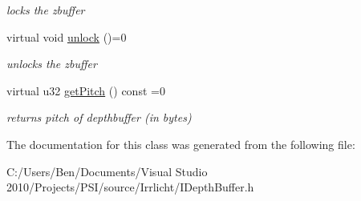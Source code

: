\begin{DoxyCompactItemize}
\begin{DoxyCompactList}\small\item\em locks the zbuffer \end{DoxyCompactList}\item 
\hypertarget{classirr_1_1video_1_1_i_depth_buffer_a34343e991438b4ad2d62d99807f124a0}{virtual void \hyperlink{classirr_1_1video_1_1_i_depth_buffer_a34343e991438b4ad2d62d99807f124a0}{unlock} ()=0}\label{classirr_1_1video_1_1_i_depth_buffer_a34343e991438b4ad2d62d99807f124a0}

\begin{DoxyCompactList}\small\item\em unlocks the zbuffer \end{DoxyCompactList}\item 
\hypertarget{classirr_1_1video_1_1_i_depth_buffer_afc80294a7fbf1d8e1ae675e674929a3f}{virtual u32 \hyperlink{classirr_1_1video_1_1_i_depth_buffer_afc80294a7fbf1d8e1ae675e674929a3f}{get\-Pitch} () const =0}\label{classirr_1_1video_1_1_i_depth_buffer_afc80294a7fbf1d8e1ae675e674929a3f}

\begin{DoxyCompactList}\small\item\em returns pitch of depthbuffer (in bytes) \end{DoxyCompactList}\end{DoxyCompactItemize}


The documentation for this class was generated from the following file\-:\begin{DoxyCompactItemize}
\item 
C\-:/\-Users/\-Ben/\-Documents/\-Visual Studio 2010/\-Projects/\-P\-S\-I/source/\-Irrlicht/I\-Depth\-Buffer.\-h\end{DoxyCompactItemize}
